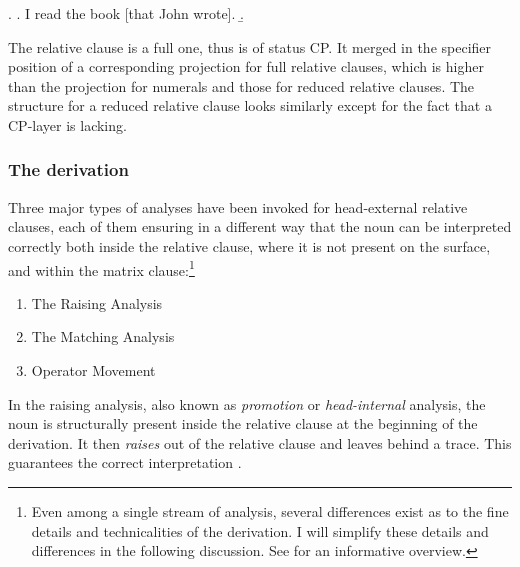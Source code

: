 \documentclass [output=book,colorlinks,citecolor=brown]{langscibook}
\begin{document}
\newpage

\ex. \a. I read the book [that John wrote].
\b. 

The relative clause is a full one, thus is of status CP. It merged in the specifier position of a corresponding projection for full relative clauses, which is higher than the projection for numerals and those for reduced relative clauses. The structure for a reduced relative clause looks similarly except for the fact that a CP-layer is lacking. %

\subsubsection{The derivation}

Three major types of analyses have been invoked for head-external relative clauses, each of them ensuring in a different way that the noun can be interpreted correctly both inside the relative clause, where it is not present on the surface, and within the matrix clause:\footnote{Even among a single stream of analysis, several differences exist as to the fine details and technicalities of the derivation. I will simplify these details and differences in the following discussion. See \citet[ch. 2]{salzmann:2017:reconstruction} for an informative overview.}

\begin{enumerate}
\item The Raising Analysis
\item The Matching Analysis
\item Operator Movement
\end{enumerate}


In the raising analysis, also known as \textit{promotion} or \textit{head-internal} analysis, the noun is structurally present inside the relative clause at the beginning of the derivation. It then \textit{raises} out of the relative clause and leaves behind a trace. This guarantees the correct interpretation \citep{schachter:1973:focus, vergnaud:1974:french, vergnaud:1985:dep, kayne:1994:anti, bianchi:1999:consequences, bhatt:2002:raising}.
\end{document}
